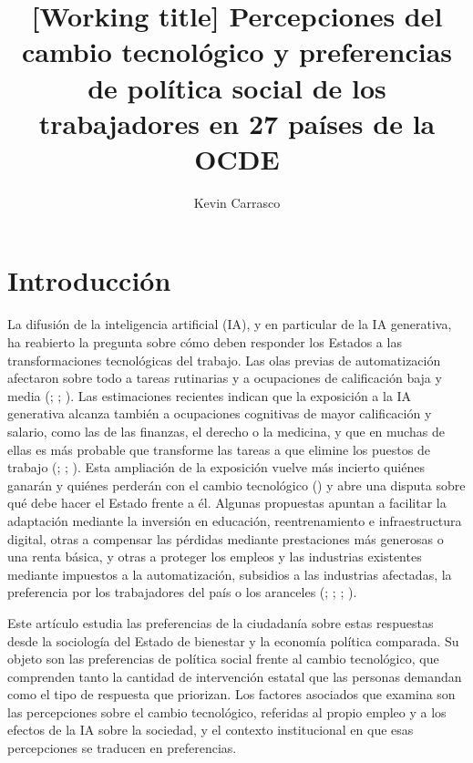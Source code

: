 \documentclass[
  spanish,
  12pt,
]{article}
\title{{[}Working title{]} Percepciones del cambio tecnológico y
preferencias de política social de los trabajadores en 27 países de la
OCDE}
\author{Kevin Carrasco}
\affil{%
                  Núcleo Milenio sobre Evolución del Trabajo (M-NEW)
              }
\date{}
\begin{document}
\maketitle


\section{Introducción}\label{introducciuxf3n}

La difusión de la inteligencia artificial (IA), y en particular de la IA
generativa, ha reabierto la pregunta sobre cómo deben responder los
Estados a las transformaciones tecnológicas del trabajo. Las olas
previas de automatización afectaron sobre todo a tareas rutinarias y a
ocupaciones de calificación baja y media
(;
;
). Las
estimaciones recientes indican que la exposición a la IA generativa
alcanza también a ocupaciones cognitivas de mayor calificación y
salario, como las de las finanzas, el derecho o la medicina, y que en
muchas de ellas es más probable que transforme las tareas a que elimine
los puestos de trabajo (; ; ). Esta ampliación
de la exposición vuelve más incierto quiénes ganarán y quiénes perderán
con el cambio tecnológico
() y abre
una disputa sobre qué debe hacer el Estado frente a él. Algunas
propuestas apuntan a facilitar la adaptación mediante la inversión en
educación, reentrenamiento e infraestructura digital, otras a compensar
las pérdidas mediante prestaciones más generosas o una renta básica, y
otras a proteger los empleos y las industrias existentes mediante
impuestos a la automatización, subsidios a las industrias afectadas, la
preferencia por los trabajadores del país o los aranceles
(;
;
;
).

Este artículo estudia las preferencias de la ciudadanía sobre estas
respuestas desde la sociología del Estado de bienestar y la economía
política comparada. Su objeto son las preferencias de política social
frente al cambio tecnológico, que comprenden tanto la cantidad de
intervención estatal que las personas demandan como el tipo de respuesta
que priorizan. Los factores asociados que examina son las percepciones
sobre el cambio tecnológico, referidas al propio empleo y a los efectos
de la IA sobre la sociedad, y el contexto institucional en que esas
percepciones se traducen en preferencias.
\end{document}

